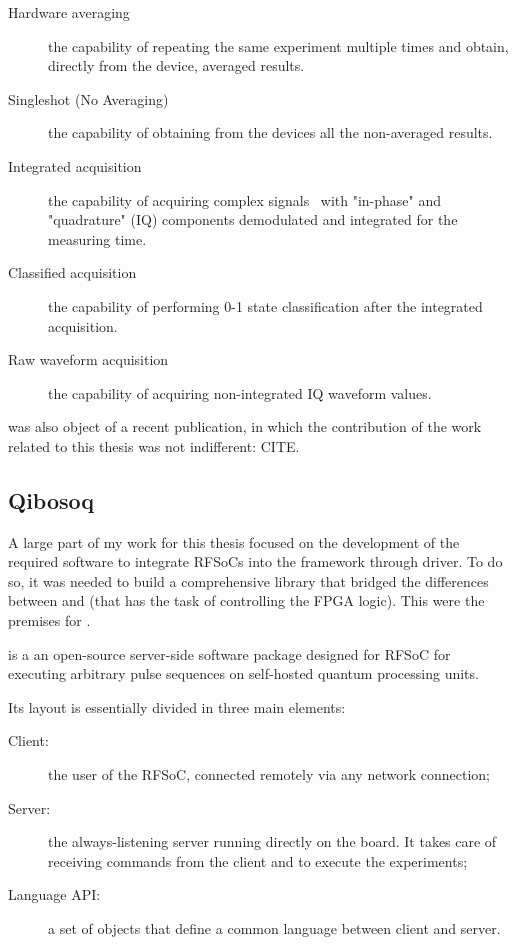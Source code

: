 \begin{description}
    \item[Hardware averaging] the capability of repeating the same experiment multiple times and obtain, directly from the device, averaged results.
    \item[Singleshot (No Averaging)] the capability of obtaining from the devices all the non-averaged results.
    \item[Integrated acquisition] the capability of acquiring complex signals~\cite{Naidu2003} with "in-phase" and "quadrature" (IQ) components demodulated and integrated for the measuring time.
    \item[Classified acquisition] the capability of performing 0-1 state classification after the integrated acquisition.
    \item[Raw waveform acquisition] the capability of acquiring non-integrated IQ waveform values.
\end{description}

\Qibolab was also object of a recent publication, in which the contribution of the work related to this thesis was not indifferent: CITE.


\subsection{Qibosoq}

A large part of my work for this thesis focused on the development of the required software to integrate RFSoCs into the \Qibo framework through \Qibolab driver.
To do so, it was needed to build a comprehensive library that bridged the differences between \Qibolab and \Qick (that has the task of controlling the FPGA logic).
This were the premises for \Qibosoq.

\Qibosoq is a an open-source server-side software package designed for RFSoC for executing arbitrary pulse sequences on self-hosted quantum processing units.

Its layout is essentially divided in three main elements:
\begin{description}
    \item[Client:] the user of the RFSoC, connected remotely via any network connection;
    \item[Server:] the always-listening server running directly on the board. It takes care of receiving commands from the client and to execute the experiments;
    \item[Language API:] a set of objects that define a common language between client and server.
\end{description}


